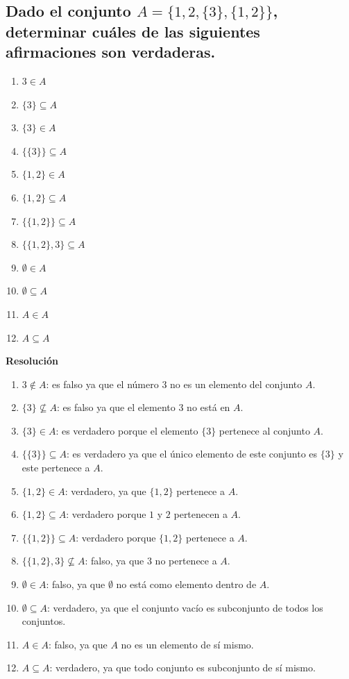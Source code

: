 \documentclass[11pt]{article}
\begin{document}
\subsection{Dado el conjunto \(A = \{1, 2, \{3\}, \{1,2\}\}\), determinar cuáles de las siguientes afirmaciones son verdaderas.}

\begin{multicols}{2}
\begin{enumerate}[label=\roman*)]
    \item \(3 \in A\)
    \item \(\{3\} \subseteq A\)
    \item \(\{3\} \in A\)
    \item \(\{\{3\}\} \subseteq A\)
    \item \(\{1,2\} \in A\)
    \item \(\{1,2\} \subseteq A\)
    \item \(\{\{1,2\}\} \subseteq A\)
    \item \(\{\{1,2\}, 3\} \subseteq A\)
    \item \(\emptyset \in A\)
    \item \(\emptyset \subseteq A\)
    \item \(A \in A\)
    \item \(A \subseteq A\)
\end{enumerate}
\end{multicols}

\textbf{Resolución}
\begin{enumerate}[label=\roman*)]
    \item \(3 \notin A\): es falso ya que el número \(3\) no es un elemento del conjunto \(A\).
    \item \(\{3\} \not\subseteq A\): es falso ya que el elemento \(3\) no está en \(A\).
    \item \(\{3\} \in A\): es verdadero porque el elemento \(\{3\}\) pertenece al conjunto \(A\).
    \item \(\{\{3\}\} \subseteq A\): es verdadero ya que el único elemento de este conjunto es \(\{3\}\) y este pertenece a \(A\). 
    \item \(\{1,2\} \in A\): verdadero, ya que \(\{1,2\}\) pertenece a \(A\).
    \item \(\{1,2\} \subseteq A\): verdadero porque \(1\) y \(2\) pertenecen a \(A\). 
    \item \(\{\{1,2\}\} \subseteq A\): verdadero porque \(\{1,2\}\) pertenece a \(A\). 
    \item \(\{\{1,2\},3\} \not\subseteq A\): falso, ya que \(3\) no pertenece a \(A\). 
    \item \(\emptyset \in A\): falso, ya que \(\emptyset\) no está como elemento dentro de \(A\).
    \item \(\emptyset \subseteq A\): verdadero, ya que el conjunto vacío es subconjunto de todos los conjuntos. 
    \item \(A \in A\): falso, ya que \(A\) no es un elemento de sí mismo.
    \item \(A \subseteq A\): verdadero, ya que todo conjunto es subconjunto de sí mismo.
\end{enumerate}
\end{document}
